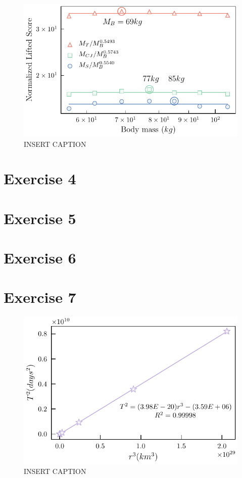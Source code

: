 \documentclass{article}
\begin{document}
\begin{figure}[h!]
  \includegraphics[width=\linewidth]{Q03/liftingPowerLawNormed.pdf}
  \caption{INSERT CAPTION}
  \label{fig:liftingPowerLawPlot}
\end{figure}

\section{Exercise 4}

\section{Exercise 5}

\section{Exercise 6}

\section{Exercise 7}

\begin{figure}[h!]
  \includegraphics[width=\linewidth]{Q07/keplerLawPlot.pdf}
  \caption{INSERT CAPTION}
  \label{fig:keplerLawPlot}
\end{figure}
\end{document}
